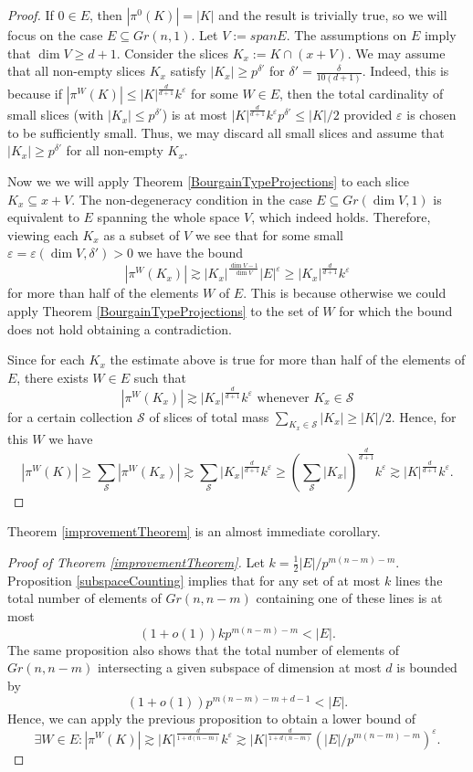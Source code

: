 \documentclass{amsart}
\begin{document}
\begin{proof}
    If $0 \in E$, then $|\pi^{0}(K)| = |K|$ and the result is trivially true, so we will focus on the case $E \subseteq Gr(n, 1)$. Let $V := span E$. The assumptions on $E$ imply that $\dim V \geq d + 1$. Consider the slices $K_x := K \cap (x + V)$. We may assume that all non-empty slices $K_x$ satisfy $|K_x| \geq p^{\delta'}$ for $\delta' = \frac{\delta}{10(d + 1)}$. Indeed, this is because if $|\pi^{W}(K)| \leq |K|^\frac{d}{d + 1}k^\varepsilon$ for some $W \in E$, then the total cardinality of small slices (with $|K_x| \leq p^{\delta'}$) is at most $|K|^{\frac{d}{d + 1}}k^\varepsilon p^{\delta'} \leq |K|/2$ provided $\varepsilon$ is chosen to be sufficiently small. Thus, we may discard all small slices and assume that $|K_x| \geq p^{\delta'}$ for all non-empty $K_x$.
    
    Now we we will apply Theorem \ref{BourgainTypeProjections} to each slice $K_x \subseteq x + V$. The non-degeneracy condition in the case $E \subseteq Gr(\dim V, 1)$ is equivalent to $E$ spanning the whole space $V$, which indeed holds. Therefore, viewing each $K_x$ as a subset of $V$ we see that for some small $\varepsilon = \varepsilon(\dim V, \delta') > 0$ we have the bound $$|\pi^W(K_x)| \gtrsim |K_x|^\frac{\dim V - 1}{\dim V}|E|^{\varepsilon} \geq |K_x|^\frac{d}{d + 1}k^{\varepsilon}$$  for more than half of the elements $W$ of $E$. This is because otherwise we could apply Theorem \ref{BourgainTypeProjections} to the set of $W$ for which the bound does not hold obtaining a contradiction. 
    
    Since for each $K_x$ the estimate above is true for more than half of the elements of $E$, there exists $W \in E$ such that $$ |\pi^W(K_x)| \gtrsim |K_x|^\frac{d}{d + 1}k^{\varepsilon} \text{ whenever } K_x \in \mathcal{S}$$ for a certain collection $\mathcal{S}$ of slices of total mass $\sum_{K_x \in \mathcal{S}} |K_x| \geq |K|/2$. Hence, for this $W$ we have 
    $$|\pi^W(K)| \geq \sum_{\mathcal{S}} |\pi^{W}(K_x)| \gtrsim \sum_{\mathcal{S}} |K_x|^\frac{d}{d + 1}k^{\varepsilon} \geq (\sum_{\mathcal{S}} |K_x|)^\frac{d}{d + 1}k^{\varepsilon} \gtrsim |K|^\frac{d}{d + 1}k^{\varepsilon}.$$
\end{proof}

Theorem \ref{improvementTheorem} is an almost immediate corollary.

\begin{proof}[Proof of Theorem \ref{improvementTheorem}]
    Let $k = \frac{1}{2}|E|/p^{m(n - m) - m}$. Proposition \ref{subspaceCounting} implies that for any set of at most $k$ lines the total number of elements of $Gr(n, n - m)$ containing one of these lines is at most $$(1 + o(1))k p^{m(n - m) - m} < |E|.$$
    The same proposition also shows that the total number of elements of $Gr(n, n - m)$ intersecting a given subspace of dimension at most $d$ is bounded by $$(1 + o(1))p^{m(n - m) - m + d - 1} < |E|.$$
    Hence, we can apply the previous proposition to obtain a lower bound of $$\exists W \in E: |\pi^{W}(K)| \gtrsim |K|^\frac{d}{1 + d(n - m)} k^\varepsilon \gtrsim |K|^\frac{d}{1 + d(n - m)}(|E|/p^{m(n - m) - m})^\varepsilon.$$
\end{proof}
\end{document}

